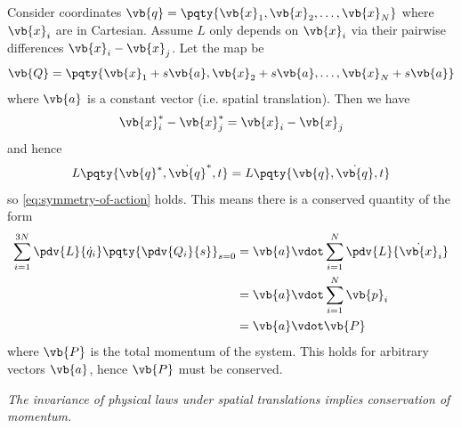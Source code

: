 \begin{example}
    Consider coordinates \(\vb{q} = \pqty{\vb{x}_1, \vb{x}_2, \ldots, \vb{x}_N}\) where \(\vb{x}_i\) are in Cartesian. Assume \(L\) only depends on \(\vb{x}_i\) via their pairwise differences \(\vb{x}_i - \vb{x}_j\). Let the map be
    \[
        \vb{Q} = \pqty{\vb{x}_1 + s \vb{a}, \vb{x}_2 + s \vb{a}, \ldots, \vb{x}_N + s \vb{a}}
    \]
    where \(\vb{a}\) is a constant vector (i.e. spatial translation). Then we have
    \[
        \vb{x}^{\ast}_i - \vb{x}^{\ast}_j = \vb{x}_i - \vb{x}_j
    \]
    and hence
    \[
        L \pqty{\vb{q}^{\ast}, \dot{\vb{q}}^{\ast}, t} = L \pqty{\vb{q}, \dot{\vb{q}}, t}
    \]
    so \eqref{eq:symmetry-of-action} holds. This means there is a conserved quantity of the form
    \begin{align*}
        \sum_{i = 1}^{3N} \pdv{L}{\dot{q}_i} \pqty{\pdv{Q_i}{s}}_{s = 0} &= \vb{a} \vdot \sum_{i = 1}^{N} \pdv{L}{\dot{\vb{x}}_i} \\
        &= \vb{a} \vdot \sum_{i = 1}^{N} \vb{p}_i \\
        &= \vb{a} \vdot \vb{P}
    \end{align*}
    where \(\vb{P}\) is the total momentum of the system. This holds for arbitrary vectors \(\vb{a}\), hence \(\vb{P}\) must be conserved.

    \textit{The invariance of physical laws under spatial translations implies conservation of momentum.}
\end{example}

